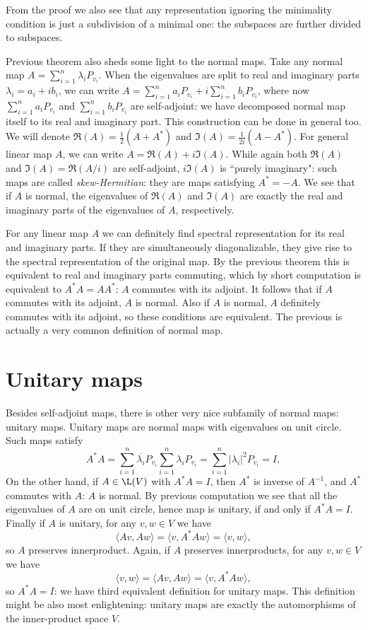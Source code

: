 From the proof we also see that any representation ignoring the minimality condition is just a subdivision of a minimal one: the subspaces are further divided to subspaces.

Previous theorem also sheds some light to the normal maps. Take any normal map $A = \sum_{i = 1}^{n} \lambda_{i} P_{v_{i}}$. When the eigenvalues are split to real and imaginary parts $\lambda_{i} = a_{i} + i b_{i}$, we can write $A = \sum_{i = 1}^{n}a_{i} P_{v_{i}} + i \sum_{i = 1}^{n}b_{i} P_{v_{i}}$, where now $\sum_{i = 1}^{n}a_{i} P_{v_{i}}$ and $\sum_{i = 1}^{n}b_{i} P_{v_{i}}$ are self-adjoint: we have decomposed normal map itself to its real and imaginary part. This construction can be done in general too.  We will denote $\Re(A) = \frac{1}{2}(A + A^{*})$ and $\Im(A) = \frac{1}{2 i}(A - A^{*})$. For general linear map $A$, we can write $A = \Re(A) + i \Im(A)$. While again both $\Re(A)$ and $\Im(A) = \Re(A/i)$ are self-adjoint, $i \Im(A)$ is ``purely imaginary": such maps are called \textit{skew-Hermitian}: they are maps satisfying $A^{*} = -A$. We see that if $A$ is normal, the eigenvalues of $\Re(A)$ and $\Im(A)$ are exactly the real and imaginary parts of the eigenvalues of $A$, respectively.

For any linear map $A$ we can definitely find spectral representation for its real and imaginary parts. If they are simultaneously diagonalizable, they give rise to the spectral representation of the original map. By the previous theorem this is equivalent to real and imaginary parts commuting, which by short computation is equivalent to $A^{*}A = A A^{*}$: $A$ commutes with its adjoint. It follows that if $A$ commutes with its adjoint, $A$ is normal. Also if $A$ is normal, $A$ definitely commutes with its adjoint, so these conditions are equivalent. The previous is actually a very common definition of normal map.

\section{Unitary maps}

Besides self-adjoint maps, there is other very nice subfamily of normal maps: unitary maps. Unitary maps are normal maps with eigenvalues on unit circle. Such maps satisfy
\[
	A^{*} A = \sum_{i = 1}^{n} \overline{\lambda_{i}} P_{v_{i}} \sum_{i = 1}^{n} \lambda_{i} P_{v_{i}} = \sum_{i = 1}^{n} |\lambda_{i}|^{2} P_{v_{i}} = I,
\]
On the other hand, if $A \in \L(V)$ with $A^{*}A = I$, then $A^{*}$ is inverse of $A^{-1}$, and $A^{*}$ commutes with $A$: $A$ is normal. By previous computation we see that all the eigenvalues of $A$ are on unit circle, hence map is unitary, if and only if $A^{*} A = I$. Finally if $A$ is unitary, for any $v, w \in V$ we have
\[
	\langle A v, A w \rangle = \langle v, A^{*}A w \rangle = \langle v, w \rangle,
\]
so $A$ preserves innerproduct. Again, if $A$ preserves innerproducts, for any $v, w \in V$ we have
\[
	\langle v, w \rangle = \langle A v, A w \rangle = \langle v, A^{*} A w \rangle,
\]
so $A^{*}A = I$: we have third equivalent definition for unitary maps. This definition might be also most enlightening: unitary maps are exactly the automorphisms of the inner-product space $V$.

